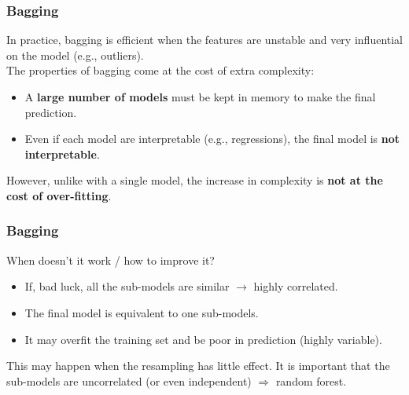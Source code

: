 \begin{frame}
\frametitle{Bagging}
In practice, bagging is efficient when the features are unstable and very influential on the model (e.g., outliers).\\
\vspace{0.3cm}
The properties of bagging come at the cost of extra complexity:
\begin{itemize}
\item A {\bf large number of models} must be kept in memory to make the final prediction.
\item Even if each model are interpretable (e.g., regressions), the final model is {\bf not interpretable}.
\end{itemize}
However, unlike with a single model, the increase in complexity is {\bf not at the cost of over-fitting}.
\end{frame}
\begin{frame}
\frametitle{Bagging}
When doesn't it work / how to improve it?
\begin{itemize}
\item If, bad luck, all the sub-models are similar $\rightarrow$ highly correlated.
\item The final model is equivalent to one sub-models.
\item It may overfit the training set and be poor in prediction (highly variable).
\end{itemize}
This may happen when the resampling has little effect. It is important that the sub-models are uncorrelated (or even independent) $\Rightarrow$ random forest.
\end{frame}
